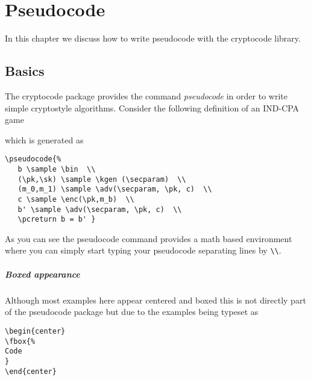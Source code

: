 \documentclass[a4paper]{report}
\begin{document}
\chapter{Pseudocode}
\label{chap:pseudocode}

In this chapter we discuss how to write pseudocode with the cryptocode library.

\section{Basics}

The cryptocode package provides the command \emph{pseudocode} in order to write simple cryptostyle algorithms.
Consider the following definition of an IND-CPA game
\begin{center}
\end{center}
which is generated as
\begin{lstlisting}
\pseudocode{%
   b \sample \bin  \\
   (\pk,\sk) \sample \kgen (\secparam)  \\
   (m_0,m_1) \sample \adv(\secparam, \pk, c)  \\
   c \sample \enc(\pk,m_b)  \\
   b' \sample \adv(\secparam, \pk, c)  \\
   \pcreturn b = b' }
\end{lstlisting}
As you can see the pseudocode command provides a math based environment where you can simply start typing your pseudocode
separating lines by \lstinline$\\$.


\paragraph{Boxed appearance}
Although most examples here appear centered and boxed this is not directly part of the pseudocode package but due to the examples being 
typeset as
\begin{lstlisting}
\begin{center}
\fbox{%
Code
}
\end{center}
\end{lstlisting}
\end{document}
